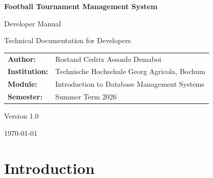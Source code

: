 \documentclass[12pt,a4paper]{article}
\begin{document}

\begin{titlepage}

\centering

\vspace*{2cm}

{\Huge \textbf{Football Tournament Management System}\par}

\vspace{1cm}

{\LARGE Developer Manual\par}

\vspace{2cm}

{\large
Technical Documentation for Developers
\par}

\vspace{1.5cm}

\begin{tabular}{ll}
\textbf{Author:} & Rostand Cedrix Assonfo Demaboi \\
\textbf{Institution:} & Technische Hochschule Georg Agricola, Bochum \\
\textbf{Module:} & Introduction to Database Management Systems \\
\textbf{Semester:} & Summer Term 2026 \\
\end{tabular}

\vfill

{\large Version 1.0}

\vspace{0.5cm}

{\large \today}

\end{titlepage}


\tableofcontents
\newpage


\section{Introduction}
\end{document}

